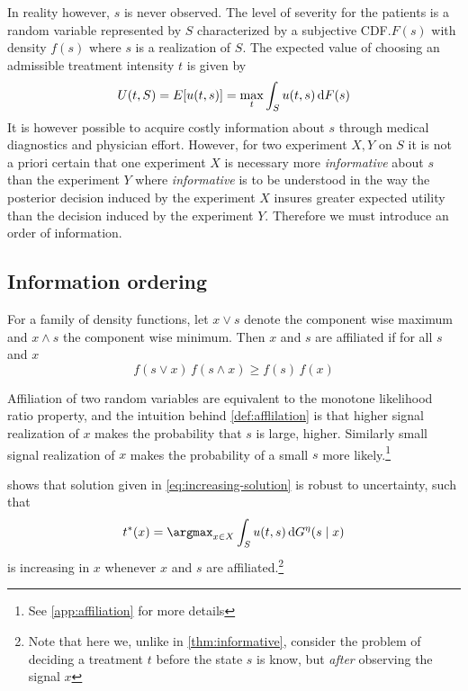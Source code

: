 In reality however, $s$ is never observed. The level of severity for the patients is a random variable represented by $S$  characterized by a subjective CDF.\@ $F(s)$  with density $f(s)$  where $s$ is a realization of $S$. The expected value of choosing an admissible treatment intensity $t$ is given by
\[
	U(t,S)=E[u(t,s)]=\max_{t}\int_{S}u(t,s)\dif F(s)\label{eq:expected-utility-prior}
\]
It is however possible to acquire costly information about $s$ through medical diagnostics and physician effort. However, for two experiment $X,Y$ on $S$  it is not a priori certain that one experiment $X$ is necessary more \emph{informative} about $s$ than the experiment $Y$  where \emph{informative} is to be understood in the way the posterior decision induced by the experiment $X$ insures greater expected utility than the decision induced by the experiment $Y$. Therefore we must introduce an order of information.

\subsection{Information ordering}

\begin{definition}\label{def:afflilation} \parencite{Milgrom1982Theory}
For a family of density functions, let $x\lor s$ denote the component wise maximum and $x\land s$ the component wise minimum. Then $x$ and $s$ are affiliated if for all $s$ and $x$
\[
	f(s\lor x)\, f(s\land x)\ge f(s)\, f(x)
\]
\end{definition}

Affiliation of two random variables are equivalent to the monotone likelihood ratio property, and the intuition behind \cref{def:afflilation} is that higher signal realization of $x$ makes the probability that $s$ is large, higher. Similarly small signal realization of $x$ makes the probability of a small $s$ more likely.\footnote{See \cref{app:affiliation} for more details}

\textcite{Athey2002Monotone}  shows that solution given in \cref{eq:increasing-solution} is robust to uncertainty, such that
\[
	t^*(x)=\argmax_{x\in X}\int_Su(t,s)\dif G^\eta(s\mid x)
\]
is increasing in $x$  whenever $x$ and $s$ are affiliated.\footnote{Note that here we, unlike in \cref{thm:informative}, consider the problem of deciding a treatment $t$ before the state $s$ is know, but \emph{after} observing the signal $x$ }

